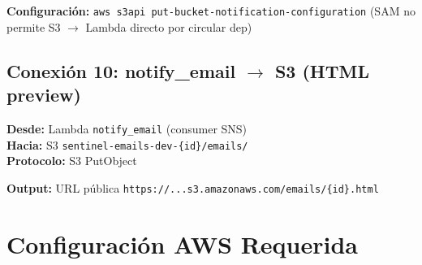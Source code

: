 \documentclass[11pt,a4paper]{article}
\begin{document}
\textbf{Configuraci\'on:} \texttt{aws s3api put-bucket-notification-configuration}
(SAM no permite S3 $\rightarrow$ Lambda directo por circular dep)

\subsection{Conexi\'on 10: notify\_email $\rightarrow$ S3 (HTML preview)}

\begin{tcolorbox}[colback=green!5, colframe=awsgreen, title=\textbf{Desde $\rightarrow$ Hasta}]
\textbf{Desde:} Lambda \texttt{notify\_email} (consumer SNS) \\
\textbf{Hacia:} S3 \texttt{sentinel-emails-dev-\{id\}/emails/} \\
\textbf{Protocolo:} S3 PutObject
\end{tcolorbox}

\begin{center}
\end{center}

\textbf{Output:} URL p\'ublica \texttt{https://...s3.amazonaws.com/emails/\{id\}.html}

\section{Configuraci\'on AWS Requerida}
\end{document}
